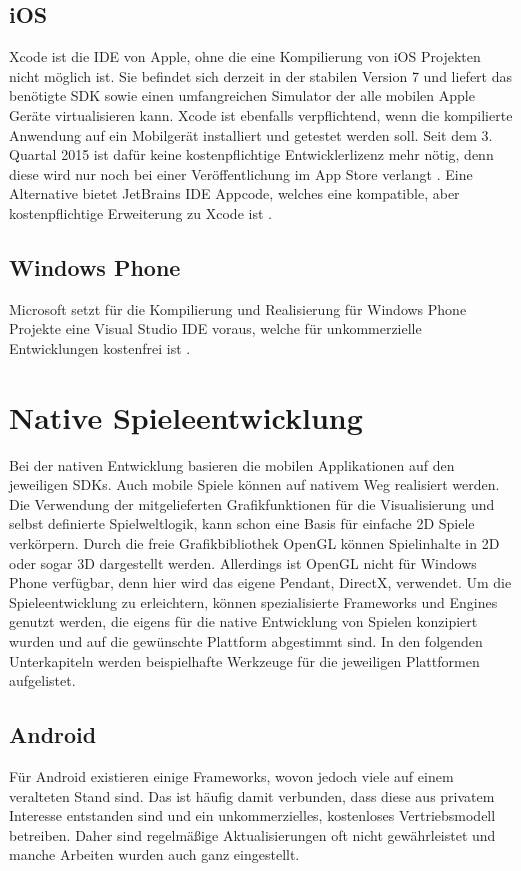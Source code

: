 \subsection{iOS}
Xcode ist die IDE von Apple, ohne die eine Kompilierung von iOS Projekten nicht möglich ist.
Sie befindet sich derzeit in der stabilen Version 7 und liefert das benötigte SDK sowie einen umfangreichen Simulator der alle mobilen Apple Geräte virtualisieren kann. Xcode ist ebenfalls verpflichtend, wenn die kompilierte Anwendung auf ein Mobilgerät installiert und getestet werden soll. Seit dem 3. Quartal 2015 ist dafür keine kostenpflichtige Entwicklerlizenz mehr nötig, denn diese wird nur noch bei einer Veröffentlichung im App Store verlangt \citep{t3n_xcode7}.
Eine Alternative bietet JetBrains IDE Appcode, welches eine kompatible, aber kostenpflichtige Erweiterung zu Xcode ist \citep{appcode}.

\subsection{Windows Phone}
Microsoft setzt für die Kompilierung und Realisierung für Windows Phone Projekte eine Visual Studio IDE voraus, welche für unkommerzielle Entwicklungen kostenfrei ist \citep{visual_studio}.

\section{Native Spieleentwicklung}
Bei der nativen Entwicklung basieren die mobilen Applikationen auf den jeweiligen SDKs. Auch mobile Spiele können auf nativem Weg realisiert werden. Die Verwendung der mitgelieferten Grafikfunktionen für die Visualisierung und selbst definierte Spielweltlogik, kann schon eine Basis für einfache 2D Spiele verkörpern. Durch die freie Grafikbibliothek OpenGL können Spielinhalte in 2D oder sogar 3D dargestellt werden. Allerdings ist OpenGL nicht für Windows Phone verfügbar, denn hier wird das eigene Pendant, DirectX, verwendet. Um die Spieleentwicklung zu erleichtern, können spezialisierte Frameworks und Engines genutzt werden, die eigens für die native Entwicklung von Spielen konzipiert wurden und auf die gewünschte Plattform abgestimmt sind. In den folgenden Unterkapiteln werden beispielhafte Werkzeuge für die jeweiligen Plattformen aufgelistet.
 

\subsection{Android}
Für Android existieren einige Frameworks, wovon jedoch viele auf einem veralteten Stand sind. Das ist häufig damit verbunden, dass diese aus privatem Interesse entstanden sind und ein unkommerzielles, kostenloses Vertriebsmodell betreiben. Daher sind regelmäßige Aktualisierungen oft nicht gewährleistet und manche Arbeiten wurden auch ganz eingestellt.

